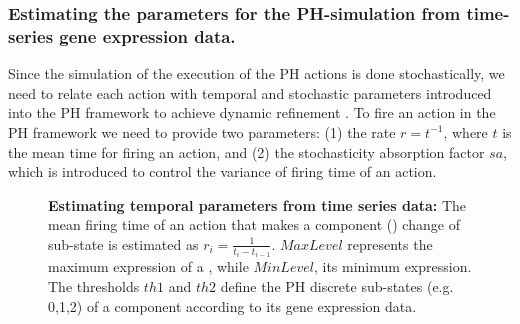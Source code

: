 
\subsubsection{Estimating the parameters for the PH-simulation from time-series gene expression data.}
\label{sssec:EPTSD}

Since the simulation of the execution of the PH actions is done stochastically, we need to relate each action with temporal 
and stochastic parameters introduced into the PH framework to achieve dynamic refinement \cite{PMR10-TCSB}. 
To fire an action in the PH framework we need to provide two parameters: (1) the rate $r=t^{-1}$, where $t$ is the mean time for firing an action,
and (2) the stochasticity absorption factor $sa$, which is introduced to control the variance of firing time of an action.


\begin{figure}[H]
\centering

	    

\caption{{\bf Estimating temporal parameters from time series data:} The mean firing time of an action that makes a
component () change of sub-state is estimated as $r_{i}=\frac{1}{t_{i}-t_{i-1}}$. $MaxLevel$ represents the maximum expression of a , while 
 $MinLevel$, its minimum expression.
The thresholds $th1$ and $th2$ define the PH discrete sub-states (e.g. 0,1,2) of a component according to its gene expression data.
\label{fig:estimationParameter}}
\end{figure}


